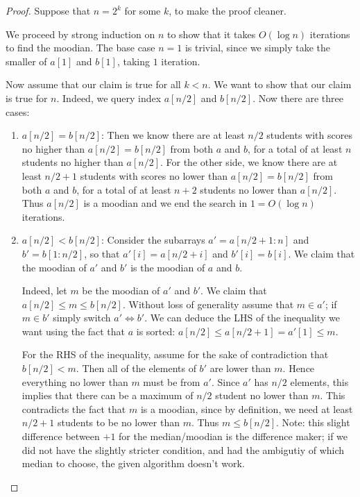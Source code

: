 \documentclass[10pt]{article}
\begin{document}
\begin{proof}
  Suppose that \(n = 2^k\) for some \(k\), to make the proof cleaner. 
  
  We proceed by strong induction on \(n\) to show that it takes \(O(\log n)\) iterations to find the moodian. The base case \(n = 1\) is trivial, since we simply take the smaller of \(a[1]\) and \(b[1]\), taking \(1\) iteration. 

  Now assume that our claim is true for all \(k < n\). We want to show that our claim is true for \(n\). Indeed, we query index \(a[n/2]\) and \(b[n/2]\). Now there are three cases: 
  \begin{enumerate}
    \item \(a[n/2] = b[n/2]\): Then we know there are at least \(n/2\) students with scores no higher than \(a[n/2] = b[n/2]\) from both \(a\) and \(b\), for a total of at least \(n\) students no higher than \(a[n/2]\). For the other side, we know there are at least \(n/2 + 1\) students with scores no lower than \(a[n/2] = b[n/2]\) from both \(a\) and \(b\), for a total of at least \(n + 2\) students no lower than \(a[n/2]\). Thus \(a[n/2]\) is a moodian and we end the search in \(1 = O(\log n)\) iterations.
    
    \item \(a[n/2] < b[n/2]\): Consider the subarrays \(a' = a[n/2+1:n]\) and \(b' = b[1:n/2]\), so that \(a'[i] = a[n/2+i]\) and \(b'[i] = b[i]\). We claim that the moodian of \(a'\) and \(b'\) is the moodian of \(a\) and \(b\). 
    
    Indeed, let \(m\) be the moodian of \(a'\) and \(b'\). We claim that \(a[n/2] \leq m \leq b[n/2]\). Without loss of generality assume that \(m \in a'\); if \(m \in b'\) simply switch \(a' \iff b'\). We can deduce the LHS of the inequality we want using the fact that \(a\) is sorted: \(a[n/2] \leq a[n/2+1] = a'[1] \leq m\). 
    
    For the RHS of the inequality, assume for the sake of contradiction that \(b[n/2] < m\). Then all of the elements of \(b'\) are lower than \(m\). Hence everything no lower than \(m\) must be from \(a'\). Since \(a'\) has \(n/2\) elements, this implies that there can be a maximum of \(n/2\) student no lower than \(m\). This contradicts the fact that \(m\) is a moodian, since by definition, we need at least \(n/2 + 1\) students to be no lower than \(m\). Thus \(m \leq b[n/2]\). Note: this slight difference between \(+1\) for the median/moodian is the difference maker; if we did not have the slightly stricter condition, and had the ambigutiy of which median to choose, the given algorithm doesn't work.


\end{enumerate}
\end{proof}
\end{document}
